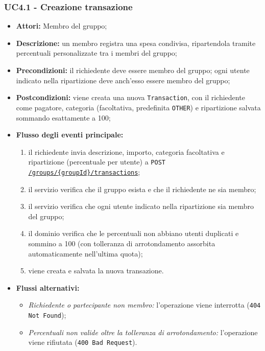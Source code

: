 \subsubsection{UC4.1 - Creazione transazione}
\begin{itemize}
    \item \textbf{Attori:} Membro del gruppo;
    \item \textbf{Descrizione:} un membro registra una spesa condivisa, ripartendola tramite percentuali personalizzate tra i membri del gruppo;
    \item \textbf{Precondizioni:} il richiedente deve essere membro del gruppo; ogni utente indicato nella ripartizione deve anch'esso essere membro del gruppo;
    \item \textbf{Postcondizioni:} viene creata una nuova \texttt{Transaction}, con il richiedente come pagatore, categoria (facoltativa, predefinita \texttt{OTHER}) e ripartizione salvata sommando esattamente a 100;
    \item \textbf{Flusso degli eventi principale:}
    \begin{enumerate}
        \item il richiedente invia descrizione, importo, categoria facoltativa e ripartizione (percentuale per utente) a \texttt{POST \url{/groups/{groupId}/transactions}};
        \item il servizio verifica che il gruppo esista e che il richiedente ne sia membro;
        \item il servizio verifica che ogni utente indicato nella ripartizione sia membro del gruppo;
        \item il dominio verifica che le percentuali non abbiano utenti duplicati e sommino a 100 (con tolleranza di arrotondamento assorbita automaticamente nell'ultima quota);
        \item viene creata e salvata la nuova transazione.
    \end{enumerate}
    \item \textbf{Flussi alternativi:}
    \begin{itemize}
        \item \emph{Richiedente o partecipante non membro:} l'operazione viene interrotta (\texttt{404 Not Found});
        \item \emph{Percentuali non valide oltre la tolleranza di arrotondamento:} l'operazione viene rifiutata (\texttt{400 Bad Request}).
    \end{itemize}
\end{itemize}

